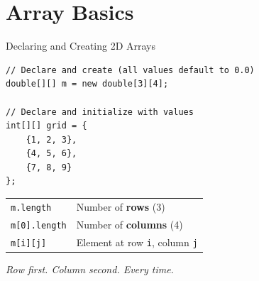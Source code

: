 \documentclass{beamer}
\begin{document}
\section{Array Basics}
\begin{frame}[fragile]{Declaring and Creating 2D Arrays}
\begin{lstlisting}
// Declare and create (all values default to 0.0)
double[][] m = new double[3][4];

// Declare and initialize with values
int[][] grid = {
    {1, 2, 3},
    {4, 5, 6},
    {7, 8, 9}
};
\end{lstlisting}
\vspace{0.3cm}
\begin{tabular}{ll}
\texttt{m.length} & Number of \textbf{rows} (3) \\
\texttt{m[0].length} & Number of \textbf{columns} (4) \\
\texttt{m[i][j]} & Element at row \texttt{i}, column \texttt{j} \\
\end{tabular}
\vspace{0.3cm}
\textit{Row first. Column second. Every time.}
\end{frame}
\end{document}
